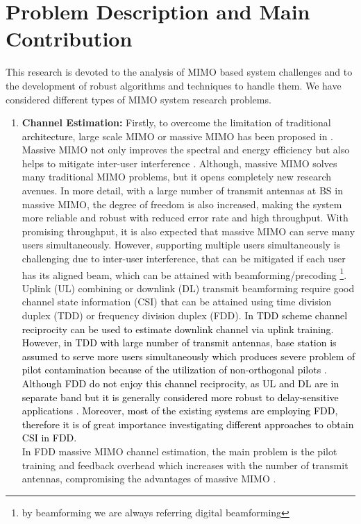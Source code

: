 \section{Problem Description and Main Contribution}
This research is devoted to the analysis of MIMO based system challenges and to the development of robust algorithms and techniques to handle them. We have considered different types of MIMO system research problems.
\begin{enumerate}
\item \textbf{Channel Estimation:}
Firstly, to overcome the limitation of traditional \textcolor{black}{architecture}, large scale MIMO or massive MIMO has been proposed in \cite{mimo_eric1,mimo_eric2}. Massive MIMO not only improves the spectral and energy efficiency but also helps to mitigate inter-user interference \cite{mimo-gain}. Although, massive MIMO  solves many traditional MIMO problems, but it opens completely new research avenues. 
In more detail, with a large number of transmit antennas at BS in massive MIMO, the degree of freedom is also increased, making the system more reliable and robust with reduced error rate and high throughput. With promising throughput, it is also expected that massive MIMO can serve many users simultaneously. However, supporting multiple users simultaneously is challenging due to inter-user interference, that can be mitigated if each user has its aligned beam, which can be attained with beamforming/precoding \footnote{by beamforming we are always referring digital beamforming}. 
Uplink (UL) combining or downlink (DL) transmit beamforming require good channel state information (CSI) \textcolor{black}{ that} can be attained using time division duplex (TDD) or frequency division duplex (FDD). \textcolor{black}{In TDD scheme channel reciprocity can be used to estimate downlink channel via uplink training. However, in TDD with large number of transmit antennas, base station is assumed to serve more users simultaneously which produces severe problem of pilot contamination because of the utilization of non-orthogonal pilots \cite{mimo_eric2}. Although FDD do not enjoy this channel reciprocity, as UL and DL are in separate band but it is generally considered more robust to delay-sensitive applications \cite{FDD_or_TDD}. Moreover, most of the existing systems are \textcolor{black}{employing} FDD, therefore it is of great importance \textcolor{black}{investigating } different approaches to obtain CSI in FDD.}\\
     In FDD massive MIMO channel estimation, the main problem is the pilot training and feedback overhead which increases with the number of transmit antennas, compromising the advantages of massive MIMO \cite{Dict_learning}.

\end{enumerate}
